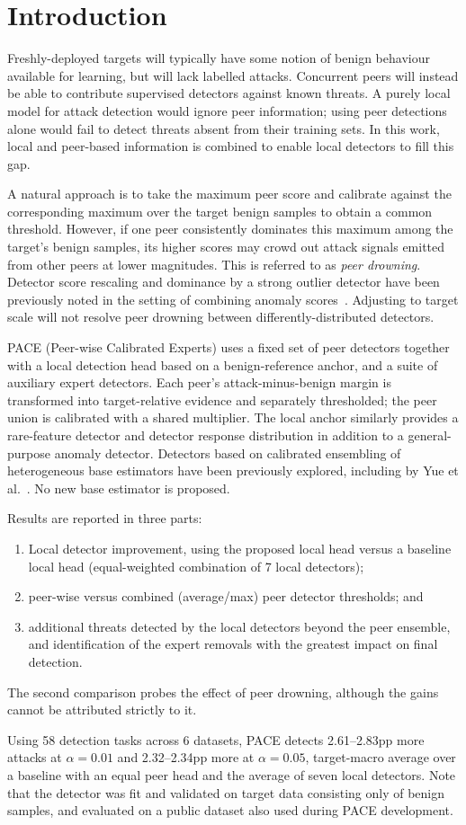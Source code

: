 \section{Introduction} 
\label{sec:intro} 
Freshly-deployed targets will typically have some notion of benign behaviour available for learning, but will lack labelled attacks. Concurrent peers will instead be able to contribute supervised detectors against known threats. A purely local model for attack detection would ignore peer information; using peer detections alone would fail to detect threats absent from their training sets. In this work, local and peer-based information is combined to enable local detectors to fill this gap.

A natural approach is to take the maximum peer score and calibrate against the corresponding maximum over the target benign samples to obtain a common threshold. However, if one peer consistently dominates this maximum among the target's benign samples, its higher scores may crowd out attack signals emitted from other peers at lower magnitudes. This is referred to as \emph{peer drowning}. Detector score rescaling and dominance by a strong outlier detector have been previously noted in the setting of combining anomaly scores~\cite{zimek2014}. Adjusting to target scale will not resolve peer drowning between differently-distributed detectors.

PACE (Peer-wise Calibrated Experts) uses a fixed set of peer detectors together with a local detection head based on a benign-reference anchor, and a suite of auxiliary expert detectors. Each peer's attack-minus-benign margin is transformed into target-relative evidence and separately thresholded; the peer union is calibrated with a shared multiplier. The local anchor similarly provides a rare-feature detector and detector response distribution in addition to a general-purpose anomaly detector. Detectors based on calibrated ensembling of heterogeneous base estimators have been previously explored, including by Yue et al.~\cite{yue2026mcde}. No new base estimator is proposed.

Results are reported in three parts:
\begin{enumerate} 
\item Local detector improvement, using the proposed local head versus a baseline local head (equal-weighted combination of 7 local detectors);
\item peer-wise versus combined (average/max) peer detector thresholds; and
\item additional threats detected by the local detectors beyond the peer ensemble, and identification of the expert removals with the greatest impact on final detection.
\end{enumerate}
The second comparison probes the effect of peer drowning, although the gains cannot be attributed strictly to it.

Using 58 detection tasks across 6 datasets, PACE detects 2.61--2.83pp more attacks at $\alpha=0.01$ and 2.32--2.34pp more at $\alpha=0.05$, target-macro average over a baseline with an equal peer head and the average of seven local detectors. Note that the detector was fit and validated on target data consisting only of benign samples, and evaluated on a public dataset also used during PACE development.